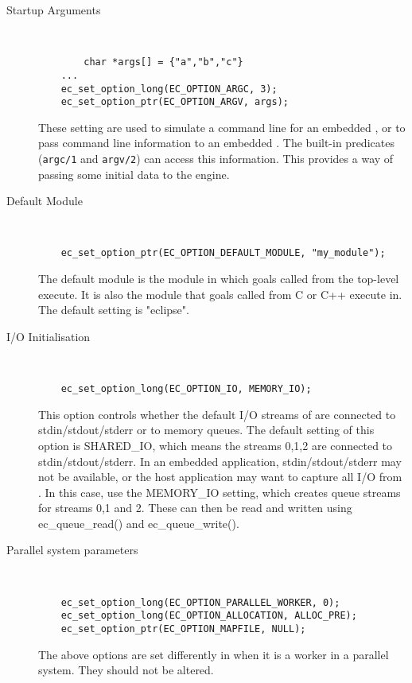 \begin{description}
\item[Startup Arguments]\ \\
\begin{verbatim}
        char *args[] = {"a","b","c"}
	...
	ec_set_option_long(EC_OPTION_ARGC, 3);
	ec_set_option_ptr(EC_OPTION_ARGV, args);
\end{verbatim}
These setting are used to simulate a command line for an embedded
{\eclipse}, or to pass command line information to an embedded
{\eclipse}.  The {\eclipse} built-in predicates (\verb.argc/1.
and \verb.argv/2.) can access this information.  This provides
a way of passing some initial data to the {\eclipse} engine.


\item[Default Module]\ \\
\begin{verbatim}
	ec_set_option_ptr(EC_OPTION_DEFAULT_MODULE, "my_module");
\end{verbatim}
The default module is the module in which goals called from the
top-level execute. It is also the module that goals called from C
or C++ execute in. The default setting is "eclipse".


\item[I/O Initialisation]\ \\
\begin{verbatim}
	ec_set_option_long(EC_OPTION_IO, MEMORY_IO);
\end{verbatim}
This option controls whether the default I/O streams of {\eclipse} are
connected to stdin/stdout/stderr or to memory queues.
The default setting of this option is SHARED_IO, which means the
{\eclipse} streams 0,1,2 are connected to stdin/stdout/stderr.
In an embedded application, stdin/stdout/stderr may not be available,
or the host application may want to capture all I/O from {\eclipse}.
In this case, use the MEMORY_IO setting, which creates queue streams
for streams 0,1 and 2. These can then be read and written using
ec_queue_read() and ec_queue_write().


\item[Parallel system parameters]\ \\
\begin{verbatim}
	ec_set_option_long(EC_OPTION_PARALLEL_WORKER, 0);
	ec_set_option_long(EC_OPTION_ALLOCATION, ALLOC_PRE);
	ec_set_option_ptr(EC_OPTION_MAPFILE, NULL);
\end{verbatim}
The above options are set differently in {\eclipse} when it is a
worker in a parallel system. They should not be altered.
\end{description}

